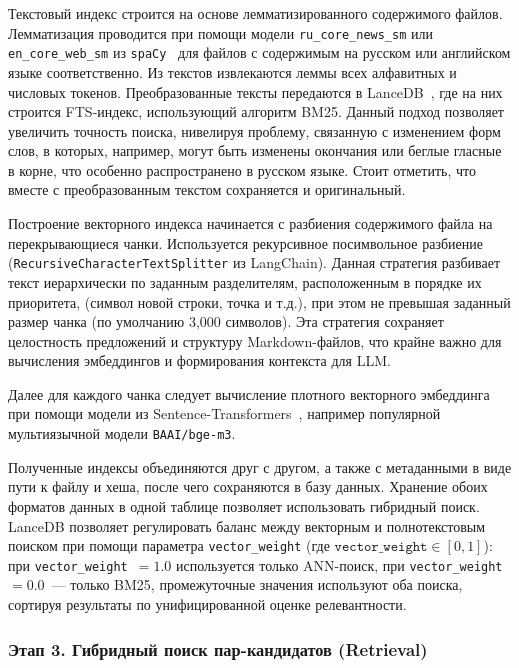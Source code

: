 Текстовый индекс строится на основе лемматизированного содержимого файлов.
Лемматизация проводится при помощи модели \texttt{ru\_core\_news\_sm}
или \texttt{en\_core\_web\_sm} из \texttt{spaCy}~\cite{spacy_software}
для файлов с содержимым на русском или английском языке соответственно.
Из текстов извлекаются леммы всех алфавитных и числовых токенов.
Преобразованные тексты передаются в LanceDB~\cite{LanceDB_online}, где на них строится FTS-индекс,
использующий алгоритм BM25.
Данный подход позволяет увеличить точность поиска, нивелируя проблему, связанную с изменением форм слов,
в которых, например, могут быть изменены окончания или беглые гласные в корне,
что особенно распространено в русском языке.
Стоит отметить, что вместе с преобразованным текстом сохраняется и оригинальный.

Построение векторного индекса начинается с разбиения содержимого файла на перекрывающиеся
чанки. Используется рекурсивное посимвольное разбиение (\texttt{RecursiveCharacterTextSplitter} из LangChain).
Данная стратегия разбивает текст иерархически по заданным разделителям, расположенным в порядке их приоритета,
(символ новой строки, точка и т.д.), при этом не превышая заданный размер чанка
(по умолчанию 3,000 символов).
Эта стратегия сохраняет целостность предложений и структуру Markdown-файлов, что крайне важно
для вычисления эмбеддингов и формирования контекста для LLM.

Далее для каждого чанка следует вычисление плотного векторного
эмбеддинга при помощи модели из Sentence-Transformers~\cite{sentence_transformers_hf},
например популярной мультиязычной модели \texttt{BAAI/bge-m3}.

Полученные индексы объединяются друг с другом, а также с метаданными в виде пути к файлу и хеша,
после чего сохраняются в базу данных.
Хранение обоих форматов данных в одной таблице позволяет использовать гибридный поиск.
LanceDB позволяет регулировать баланс между векторным и полнотекстовым поиском при помощи параметра
\texttt{vector\_weight} (где $\texttt{vector\_weight} \in [0, 1]$): при \texttt{vector\_weight}~$= 1.0$ используется только ANN-поиск,
при \texttt{vector\_weight}~$= 0.0$~--- только BM25,
промежуточные значения используют оба поиска, сортируя результаты по унифицированной оценке релевантности.

\subsubsection*{Этап 3. Гибридный поиск пар-кандидатов (Retrieval)}

